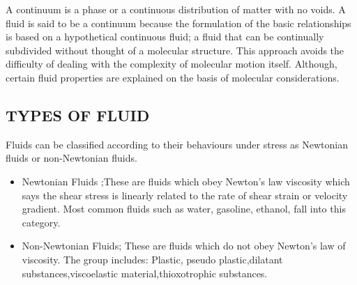 \documentclass[a4paper,12pt]{report}
\begin{document}
{A continuum is a phase or a continuous distribution of matter with no voids. A fluid is said to be a continuum because the formulation of the basic relationships is based on a hypothetical continuous fluid; a fluid that can be continually subdivided without thought of a molecular structure. This approach avoids the difficulty of dealing with the complexity of molecular motion itself. Although, certain fluid properties are explained on the basis of molecular considerations.
\subsection{TYPES OF FLUID} 
Fluids can be classified according to their behaviours under stress as Newtonian fluids or non-Newtonian fluids. 
\begin{itemize}
\item Newtonian Fluids ;These are fluids which obey Newton’s law viscosity which says the shear stress is linearly related to the rate of shear strain or velocity gradient. Most common fluids such as water, gasoline, ethanol, fall into this category.
\item Non-Newtonian Fluids; These are fluids which do not obey Newton’s law of viscosity. The group includes: Plastic, pseudo plastic,dilatant substances,viscoelastic material,thioxotrophic substances.
\end{itemize}
}
\end{document}
